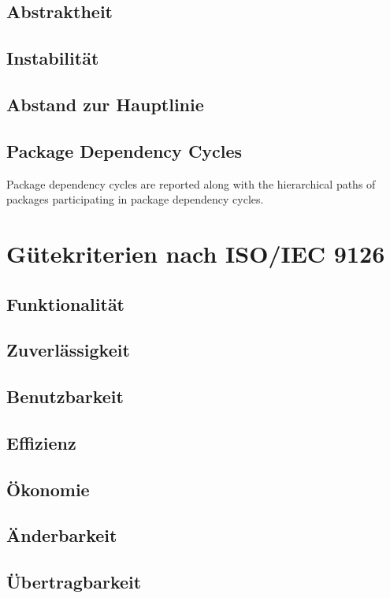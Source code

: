 \documentclass[10pt]{scrreprt}
\begin{document}
\subsection*{Abstraktheit}
\subsection*{Instabilität}
\subsection*{Abstand zur Hauptlinie}
\subsection*{Package Dependency Cycles}     Package dependency cycles are reported along with the hierarchical paths of packages participating in package dependency cycles.


\section{Gütekriterien nach ISO/IEC 9126}
\subsection*{Funktionalität}
\subsection*{Zuverlässigkeit}
\subsection*{Benutzbarkeit}
\subsection*{Effizienz}
\subsection*{Ökonomie}
\subsection*{Änderbarkeit}
\subsection*{Übertragbarkeit}
\end{document}
